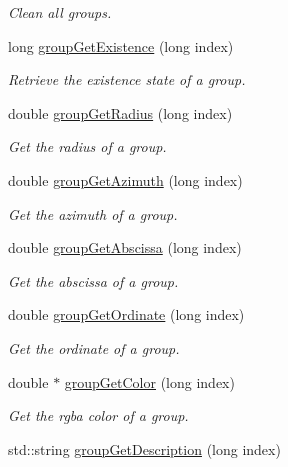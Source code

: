 \begin{DoxyCompactItemize}
\begin{DoxyCompactList}\small\item\em Clean all groups. \end{DoxyCompactList}\item 
long \hyperlink{class_hoa2_d_1_1_sources_manager_a1330d2f2512d891844771a68976f5583}{group\-Get\-Existence} (long index)
\begin{DoxyCompactList}\small\item\em Retrieve the existence state of a group. \end{DoxyCompactList}\item 
double \hyperlink{class_hoa2_d_1_1_sources_manager_a51233263a448bdb88064b2b886bfc5c6}{group\-Get\-Radius} (long index)
\begin{DoxyCompactList}\small\item\em Get the radius of a group. \end{DoxyCompactList}\item 
double \hyperlink{class_hoa2_d_1_1_sources_manager_a193f8e87b2d52a86c79a58d6c42da3d3}{group\-Get\-Azimuth} (long index)
\begin{DoxyCompactList}\small\item\em Get the azimuth of a group. \end{DoxyCompactList}\item 
double \hyperlink{class_hoa2_d_1_1_sources_manager_a7e42d33309bcfc8b69c94c2d22ebe93c}{group\-Get\-Abscissa} (long index)
\begin{DoxyCompactList}\small\item\em Get the abscissa of a group. \end{DoxyCompactList}\item 
double \hyperlink{class_hoa2_d_1_1_sources_manager_af28cdaa6a0d8b33744aa4a0ce17d153a}{group\-Get\-Ordinate} (long index)
\begin{DoxyCompactList}\small\item\em Get the ordinate of a group. \end{DoxyCompactList}\item 
double $\ast$ \hyperlink{class_hoa2_d_1_1_sources_manager_a5eeafa034d625f8be4df3ce400e5c6cb}{group\-Get\-Color} (long index)
\begin{DoxyCompactList}\small\item\em Get the rgba color of a group. \end{DoxyCompactList}\item 
std\-::string \hyperlink{class_hoa2_d_1_1_sources_manager_a65a34113c9de807e7b9327f8417d434f}{group\-Get\-Description} (long index)

\end{DoxyCompactItemize}
